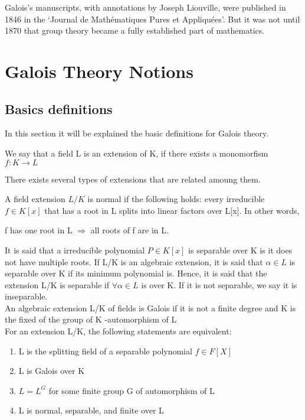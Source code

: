 \documentclass[a4paper, 10pt]{article}
\theoremstyle{plain}
\theoremstyle{definition}
\theoremstyle{remark}
\begin{document}
Galois’s manuscripts, with annotations by Joseph Liouville, were published in 1846 in the ‘Journal de Mathématiques Pures et Appliquées’. But it was not until 1870 that group theory became a fully established part of mathematics. 


    \bigskip
    \section{Galois Theory Notions}

    \subsection{Basics definitions}
In this section it will be explained the basic definitions for Galois theory. 

We say that a field L is an extension of K, if there exists a monomorfism $f: K \rightarrow  L$ 

There exists several types of extensions that are related amoung them.

A field extension $L/K$ is normal if the following holds:
every irreducible $f \in K[x]$ that has a root in L splits into linear factors over L[x]. In other words, 
\begin{center}
	f has one root in L $\Rightarrow$ all roots of f are in L.
\end{center}

	It is said that a irreducible polynomial $P \in K[x]$ is separable over K is it does not have multiple roots. If L/K is an algebraic extension, it is said that $\alpha \in L$ is separable over K if its minimum polynomial is. Hence, it is said that the extension L/K is separable if $\forall \alpha \in L$ is over K. If it is not separable, we say it is inseparable. \\
	
	An algebraic extension L/K of fields is Galois if it is not a finite degree and K is the fixed of the group of K -automorphism of L
	\\
	
	For an extension L/K, the following statements are equivalent:
	\begin{enumerate}
	\item L is the splitting field of a separable polynomial $f \in F[X]$
	\item L is Galois over K
	\item $L = L^G$ for some finite group G of automorphism of L
	\item L is normal, separable, and finite over L
	\end{enumerate}
	
\end{document}
